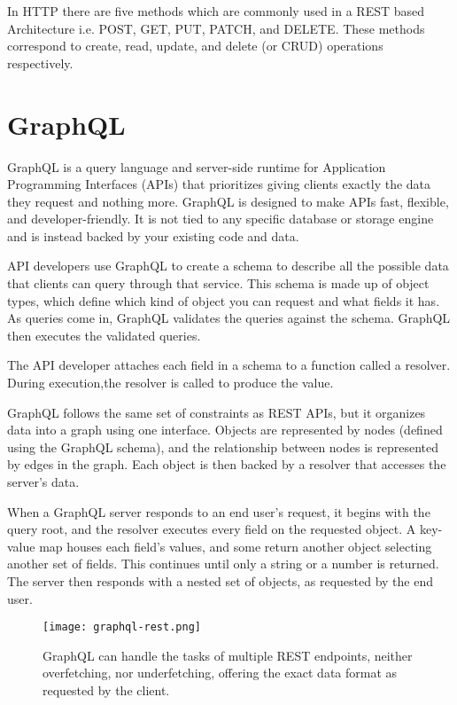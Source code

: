 In HTTP there are five methods which are commonly used in a REST based Architecture 
i.e. POST, GET, PUT, PATCH, and DELETE. These methods correspond to create, read, 
update, and delete (or CRUD) operations respectively.~\cite{GeeksRestAPI}

\section{GraphQL}

GraphQL is a query language and server-side runtime for Application Programming Interfaces (APIs) 
that prioritizes giving clients exactly the data they request and nothing more. 
GraphQL is designed to make APIs fast, flexible, and developer-friendly. It is not tied 
to any specific database or storage engine and is instead backed by your existing code and data.

API developers use GraphQL to create a schema to describe all the possible data that clients can query 
through that service. This schema is made up of object types, which define which kind of object you can 
request and what fields it has. As queries come in, GraphQL validates the queries against the schema. 
GraphQL then executes the validated queries.

The API developer attaches each field in a schema to a function called a resolver. 
During execution,the resolver is called to produce the value.~\cite{WhatisGraphQL}

GraphQL follows the same set of constraints as REST APIs, but it organizes data into a 
graph using one interface. Objects are represented by nodes (defined using the GraphQL schema), 
and the relationship between nodes is represented by edges in the graph. Each object is then backed 
by a resolver that accesses the server’s data.

When a GraphQL server responds to an end user’s request, it begins with the query root,
and the resolver executes every field on the requested object. A key-value map houses each field’s
values, and some return another object selecting another set of fields. This continues until only a 
string or a number is returned. The server then responds with a nested set of objects, as requested by 
the end user.~\cite{RubrikGraphQL}

\begin{figure}
    \begin{center}
        \texttt{[image: graphql-rest.png]}
    \end{center}
    \caption{GraphQL can handle the tasks of multiple REST endpoints, 
    neither overfetching, nor underfetching,
    offering the exact data format as requested by the client.}
    \label{fig:graphql}
\end{figure}
  
